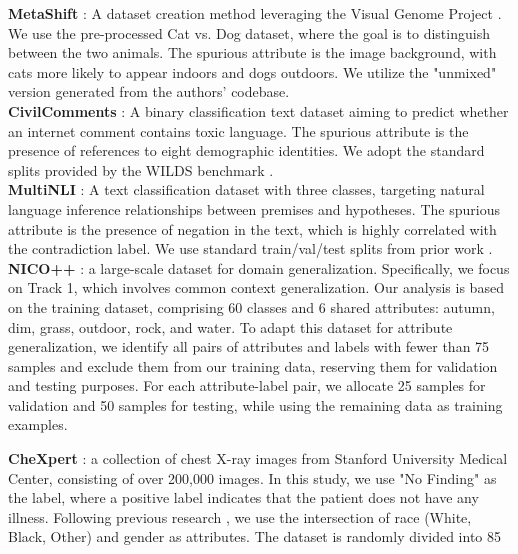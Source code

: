 \textbf{MetaShift} \citep{liang2022metashift}: A dataset creation method leveraging the Visual Genome Project \citep{krishna2017visual}. We use the pre-processed Cat vs. Dog dataset, where the goal is to distinguish between the two animals. The spurious attribute is the image background, with cats more likely to appear indoors and dogs outdoors. We utilize the "unmixed" version generated from the authors' codebase. \\

\textbf{CivilComments} \citep{borkan2019nuanced}: A binary classification text dataset aiming to predict whether an internet comment contains toxic language. The spurious attribute is the presence of references to eight demographic identities. We adopt the standard splits provided by the WILDS benchmark \citep{koh2021wilds}. \\

\textbf{MultiNLI} \citep{williams2017broad}: A text classification dataset with three classes, targeting natural language inference relationships between premises and hypotheses. The spurious attribute is the presence of negation in the text, which is highly correlated with the contradiction label. We use standard train/val/test splits from prior work \citep{idrissi2022simple}. \\

\textbf{NICO++} \citep{zhang2023nico}: a large-scale dataset for domain generalization. Specifically, we focus on Track 1, which involves common context generalization. Our analysis is based on the training dataset, comprising 60 classes and 6 shared attributes: autumn, dim, grass, outdoor, rock, and water. To adapt this dataset for attribute generalization, we identify all pairs of attributes and labels with fewer than 75 samples and exclude them from our training data, reserving them for validation and testing purposes. For each attribute-label pair, we allocate 25 samples for validation and 50 samples for testing, while using the remaining data as training examples.

\textbf{CheXpert} \citep{irvin2019chexpert}:   a collection of chest X-ray images from Stanford University Medical Center, consisting of over 200,000 images. In this study, we use "No Finding" as the label, where a positive label indicates that the patient does not have any illness. Following previous research \citep{seyyed2021underdiagnosis}, we use the intersection of race (White, Black, Other) and gender as attributes. The dataset is randomly divided into 85%


